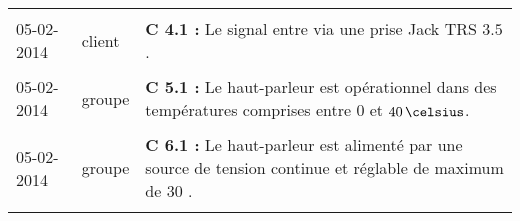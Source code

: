 \begin{center}
\begin{tabular}{|p{2cm}|p{1.5cm}|p{13.2cm}|}
	& &\\
	 	05-02-2014 & client & \textbf{C 4.1 :} Le signal entre via une prise Jack TRS $3.5$ \milli \meter.\\
	& &\\
		05-02-2014 & groupe & \textbf{C 5.1 :} Le haut-parleur est opérationnel dans des températures comprises entre $0$ et $40\,\celsius$.\\
	& &\\
		05-02-2014 & groupe & \textbf{C 6.1 :} Le haut-parleur est alimenté par une source de tension continue et réglable de maximum de $30$ \volt.\\
	 & &\\
\hline
 \end{tabular}
 \end{center}
